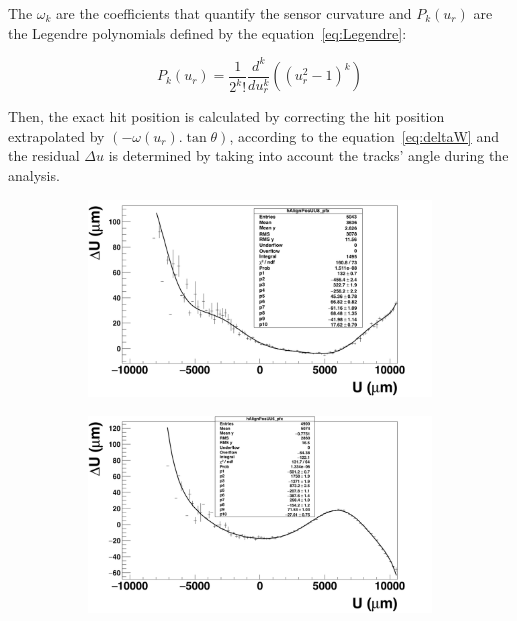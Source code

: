       The $\omega_{k}$ are the coefficients that quantify the sensor curvature and $P_{k}(u_{r})$ are the Legendre polynomials defined by the equation~\ref{eq:Legendre}:

      \begin{equation}
        P_{k}\left(u_{r}\right) = \frac{1}{2^{k}!}\frac{d^{k}}{du_{r}^{k}} \left( (u_{r}^2 - 1)^{k}\right)
        \label{eq:Legendre}
      \end{equation}

      Then, the exact hit position is calculated by correcting the hit position extrapolated by $\left(-\omega(u_{r}).\tan{\theta}\right)$, according to the equation~\ref{eq:deltaW} and the residual $\Delta u$ is determined by taking into account the tracks' angle during the analysis.      

      \begin{figure}[h]
        \centering
        \begin{subfigure}[t]{0.45\textwidth}
          \centering
          \includegraphics[width = 1.2\textwidth]{Pictures/deformation/profileFitted_pl8.png}
          \caption{}
          \label{fig:profileFitted_front}
        \end{subfigure}
        \hfill
        \begin{subfigure}[t]{0.45\textwidth}
          \centering
          \includegraphics[width = 1.2\textwidth]{Pictures/deformation/profileFitted_pl6.png}

\end{subfigure}
\end{figure}
